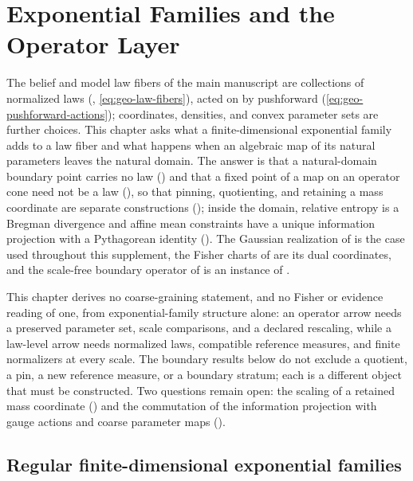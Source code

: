 \chapter{Exponential Families and the Operator Layer}
\label{ch:expfamily}

The belief and model law fibers of the main manuscript are collections of
normalized laws (, \eqref{eq:geo-law-fibers}), acted on by
pushforward (\eqref{eq:geo-pushforward-actions}); coordinates, densities, and
convex parameter sets are further choices. This chapter asks what a
finite-dimensional exponential family adds to a law fiber and what happens
when an algebraic map of its natural parameters leaves the natural domain. The
answer is that a natural-domain boundary point carries no law
() and that a fixed point of a map on an
operator cone need not be a law (), so that
pinning, quotienting, and retaining a mass coordinate are separate
constructions (); inside the domain, relative entropy is
a Bregman divergence and affine mean constraints have a unique information
projection with a Pythagorean identity
(). The Gaussian realization of
 is the case used throughout this supplement, the
Fisher charts of  are its dual coordinates, and the
scale-free boundary operator of  is an
instance of .

This chapter derives no coarse-graining statement, and no Fisher or evidence
reading of one, from exponential-family structure alone: an operator arrow
needs a preserved parameter set, scale comparisons, and a declared rescaling,
while a law-level arrow needs normalized laws, compatible reference measures,
and finite normalizers at every scale. The boundary results below do not
exclude a quotient, a pin, a new reference measure, or a boundary stratum;
each is a different object that must be constructed. 
Two questions remain open: the scaling of a retained mass coordinate
() and the commutation of the information
projection with gauge actions and coarse parameter maps
().

\section{Regular finite-dimensional exponential families}
\label{sec:exp-family}


